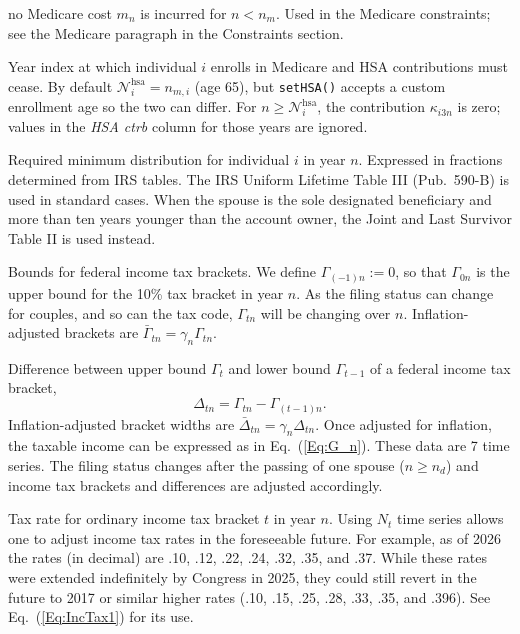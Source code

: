 \documentclass[fleqn,12pt]{report}
\begin{document}
\begin{description}[leftmargin=4em,style=multiline]
	no Medicare cost $m_n$ is incurred for $n < n_m$.
	Used in the Medicare constraints; see the Medicare paragraph in the Constraints section.
\item [$\mathcal{N}^{\mathrm{hsa}}_i$]
	Year index at which individual $i$ enrolls in Medicare and HSA contributions must
	cease.  By default $\mathcal{N}^{\mathrm{hsa}}_i = n_{m,i}$ (age 65), but
	\texttt{setHSA()} accepts a custom enrollment age so the two can differ.
	For $n \ge \mathcal{N}^{\mathrm{hsa}}_i$, the contribution $\kappa_{i3n}$
	is zero; values in the \textit{HSA ctrb} column for those years are ignored.
\item [$\rho_{in}$]
	Required minimum distribution for individual $i$ in year $n$. Expressed in fractions
	determined from IRS tables. The IRS Uniform Lifetime Table III (Pub.\ 590-B) is used in
	standard cases. When the spouse is the sole designated beneficiary and more than ten years
	younger than the account owner, the Joint and Last Survivor Table II is used instead.
\item [$\Gamma_{tn}$]
	Bounds for federal income tax brackets. We define $\Gamma_{(-1)n} := 0$, so that
	$\Gamma_{0n}$ is the upper bound for the 10\% tax bracket in year $n$. As the filing status
	can change for couples, and so can the tax code, $\Gamma_{tn}$ will be changing over $n$.
	Inflation-adjusted brackets are $\bar{\Gamma}_{tn} = \gamma_n \Gamma_{tn}$.
\item [$\Delta_{tn}$]
	Difference between upper bound $\Gamma_t$ and lower bound $\Gamma_{t-1}$
	of a federal income tax bracket,
	\begin{equation}
		\Delta_{tn} = \Gamma_{tn} - \Gamma_{(t-1)n}.
	\end{equation}
	Inflation-adjusted bracket widths are $\bar{\Delta}_{tn} = \gamma_n \Delta_{tn}$.
	Once adjusted for inflation,
	the taxable income can be expressed as in Eq.~(\ref{Eq:G_n}). These data are 7 time series.
	The filing status changes after the passing of one spouse ($n \ge n_d$) and income tax
	brackets and differences are adjusted accordingly.
\item [$\theta^x_{tn}$]
	Tax rate for ordinary income tax bracket $t$ in year $n$. Using $N_t$ time series allows one to adjust income
	tax rates in the foreseeable future.
	For example, as of 2026 the rates (in decimal) are .10, .12, .22, .24, .32, .35, and .37.
        While these rates were extended indefinitely by Congress in 2025, they could still
	revert in the future to 2017 or similar higher rates
	(.10, .15, .25, .28, .33, .35, and .396). See Eq.~(\ref{Eq:IncTax1}) for its use.

\end{description}
\end{document}
